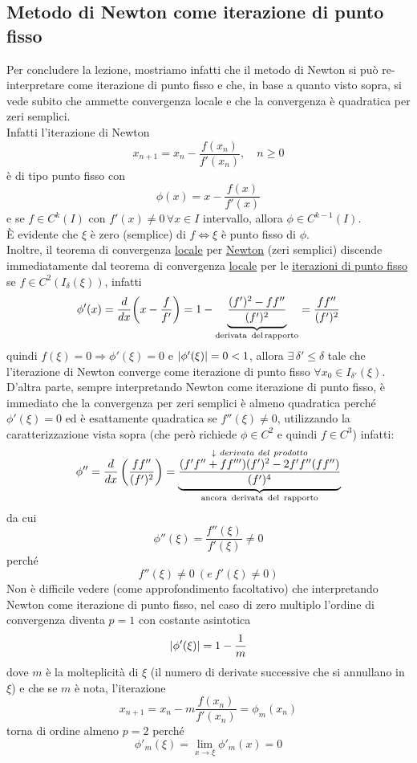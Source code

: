 \subsection{Metodo di Newton come iterazione di punto fisso}
Per concludere la lezione, mostriamo infatti che il metodo di Newton si può re-interpretare come iterazione di punto fisso e che, in base a quanto visto sopra, si vede subito che ammette convergenza locale e che la convergenza è quadratica per zeri semplici.\\
Infatti l'iterazione di Newton
\[x_{n+1} = x_n - \frac{f(x_n)}{f'(x_n)}, \quad n\ge 0\]
è di tipo punto fisso con
\[\phi(x) = x - \frac{f(x)}{f'(x)}\]
e se $f \in C^k(I)$ con $f'(x)\ne 0 \,\forall x \in I$ intervallo, allora $\phi \in C^{k-1}(I)$.\\
È evidente che $\xi$ è zero (semplice) di $f \iff \xi$ è punto fisso di $\phi$.\\
Inoltre, il teorema di convergenza \uline{locale} per \uline{Newton} (zeri semplici) discende immediatamente dal teorema di convergenza \uline{locale} per le \uline{iterazioni di punto fisso} se $f \in C^2(I_\delta(\xi))$, infatti
\[ \phi'(x) = \frac{d}{dx}\biggl(x-\frac{f}{f'}\biggr) = 1 - \underbrace{\frac{(f')^2 - ff''}{(f')^2}}_{\text{derivata\, del\,rapporto}} = \frac{ff''}{(f')^2}\]
quindi $f(\xi)=0 \Rightarrow \phi'(\xi)=0$ e $\lvert\phi'(\xi)\rvert=0<1$, allora $\exists\, \delta'\le \delta$ tale che l'iterazione di Newton converge come iterazione di punto fisso $\forall x_0 \in I_{\delta'}(\xi)$.\\
D'altra parte, sempre interpretando Newton come iterazione di punto fisso, è immediato che la convergenza per zeri semplici è almeno quadratica perché $\phi'(\xi)=0$ ed è esattamente quadratica se $f''(\xi)\neq0$, utilizzando la caratterizzazione vista sopra (che però richiede $\phi \in C^2$ e quindi $f\in C^3$) infatti:
\[\phi''=\frac{d}{dx}\left(\frac{f f''}{(f')^2}\right)= \underbrace{\frac{\overset{ \downarrow \ derivata \ del \ prodotto}{(f' f''+f f''')(f')^2-2 f' f'' (f f'')}}{(f')^4}}_{\text{ancora\, derivata\, del\, rapporto}}\]
da cui 
\[ \phi''(\xi)=\frac{f''(\xi)}{f'(\xi)}\neq 0 \]
perché 
\begin{equation*}
    f''(\xi)\neq 0 \ ( e \ f'(\xi)\neq0)
\end{equation*}
Non è difficile vedere (come approfondimento facoltativo) che interpretando Newton come iterazione di punto fisso, nel caso di zero multiplo l'ordine di convergenza diventa $p=1$ con costante asintotica 
\[\lvert\phi'(\xi)\rvert=1-\frac{1}{m}\] 
dove $m$ è la molteplicità di $\xi$ (il numero di derivate successive che si annullano in $\xi$) e che se $m$ è nota, l'iterazione
\[x_{n+1}=x_n-m\frac{f(x_n)}{f'(x_n)}=\phi_m(x_n)\]
torna di ordine almeno $p=2$ perché 
\[\phi'_m(\xi)=\lim_{x\to\xi}\phi'_m(x)=0\]
\newpage